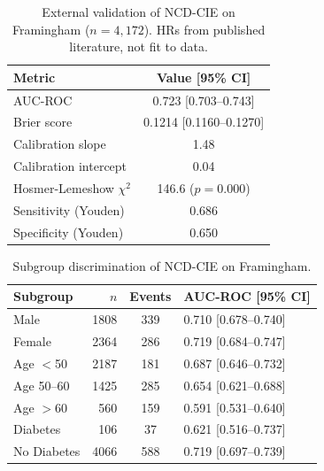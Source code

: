 \begin{table}[t]
\centering
\caption{External validation of NCD-CIE on Framingham ($n=4,172$). HRs from published literature, not fit to data.}
\label{tab:framingham}
\small
\begin{tabular}{@{}lc@{}}
\toprule
\textbf{Metric} & \textbf{Value [95\% CI]} \\
\midrule
AUC-ROC & 0.723 [0.703--0.743] \\
Brier score & 0.1214 [0.1160--0.1270] \\
Calibration slope & 1.48 \\
Calibration intercept & 0.04 \\
Hosmer-Lemeshow $\chi^2$ & 146.6 ($p=0.000$) \\
Sensitivity (Youden) & 0.686 \\
Specificity (Youden) & 0.650 \\
\bottomrule
\end{tabular}
\end{table}

\begin{table}[t]
\centering
\caption{Subgroup discrimination of NCD-CIE on Framingham.}
\label{tab:framingham-subgroup}
\small
\begin{tabular}{@{}lrcl@{}}
\toprule
\textbf{Subgroup} & \textbf{$n$} & \textbf{Events} & \textbf{AUC-ROC [95\% CI]} \\
\midrule
Male & 1808 & 339 & 0.710 [0.678--0.740] \\
Female & 2364 & 286 & 0.719 [0.684--0.747] \\
Age $<$50 & 2187 & 181 & 0.687 [0.646--0.732] \\
Age 50--60 & 1425 & 285 & 0.654 [0.621--0.688] \\
Age $>$60 & 560 & 159 & 0.591 [0.531--0.640] \\
Diabetes & 106 & 37 & 0.621 [0.516--0.737] \\
No Diabetes & 4066 & 588 & 0.719 [0.697--0.739] \\
\bottomrule
\end{tabular}
\end{table}

